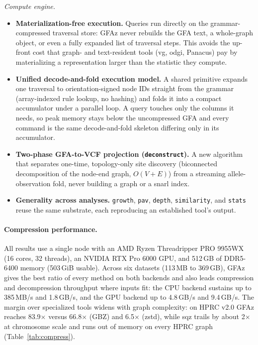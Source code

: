 \documentclass[11pt]{article}
\newcommand{\gfaz}{GFAz\xspace}
\begin{document}
\smallskip\noindent\emph{Compute engine.}
\begin{itemize}[nosep, leftmargin=1.2em]
  \item \textbf{Materialization-free execution.} Queries run directly on the
        grammar-compressed traversal store: \gfaz never rebuilds the GFA text, a
        whole-graph object, or even a fully expanded list of traversal steps. This
        avoids the up-front cost that graph- and text-resident tools (vg, odgi,
        Panacus) pay by materializing a representation larger than the statistic they
        compute.
  \item \textbf{Unified decode-and-fold execution model.} A shared primitive expands
        one traversal to orientation-signed node IDs straight from the grammar
        (array-indexed rule lookup, no hashing) and folds it into a compact
        accumulator under a parallel loop. A query touches only the columns it needs,
        so peak memory stays below the uncompressed GFA and every command is the same
        decode-and-fold skeleton differing only in its accumulator.
  \item \textbf{Two-phase GFA-to-VCF projection (\texttt{deconstruct}).} A new
        algorithm that separates one-time, topology-only site discovery (biconnected
        decomposition of the node-end graph, $O(V{+}E)$) from a streaming
        allele-observation fold, never building a graph or a snarl index.
  \item \textbf{Generality across analyses.} \texttt{growth}, \texttt{pav},
        \texttt{depth}, \texttt{similarity}, and \texttt{stats} reuse the same
        substrate, each reproducing an established tool's output.
\end{itemize}

\paragraph{Compression performance.}
All results use a single node with an AMD Ryzen Threadripper PRO 9955WX (16 cores,
32 threads), an NVIDIA RTX Pro 6000 GPU, and 512\,GB of DDR5-6400 memory (503\,GiB
usable). Across six datasets (113\,MB to 369\,GB), \gfaz gives the best ratio of every
method on both backends and also leads compression and decompression throughput where
inputs fit: the CPU backend sustains up to 385\,MB/s and 1.8\,GB/s, and the GPU
backend up to 4.8\,GB/s and 9.4\,GB/s. The margin over specialized tools widens with
graph complexity: on HPRC v2.0 \gfaz reaches 83.9$\times$ versus 66.8$\times$ (GBZ)
and 6.5$\times$ (zstd), while sqz trails by about 2$\times$ at chromosome scale and
runs out of memory on every HPRC graph (Table~\ref{tab:compress}).
\end{document}

